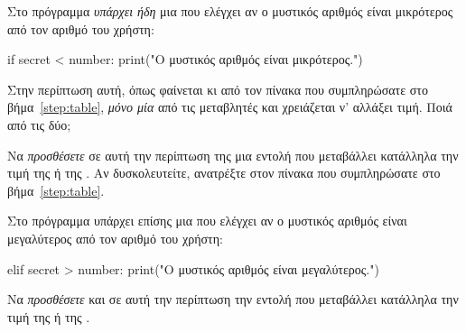 \documentclass[a4paper,11pt,oneside]{book}
\begin{document}
\begin{step}

Στο πρόγραμμα \emph{υπάρχει ήδη} μια  που ελέγχει αν ο μυστικός αριθμός είναι μικρότερος από τον αριθμό του χρήστη:

\begin{pyplain}
    if secret < number:
        print("Ο μυστικός αριθμός είναι μικρότερος.")
\end{pyplain}

Στην περίπτωση αυτή, όπως φαίνεται κι από τον πίνακα που συμπληρώσατε στο βήμα~\ref{step:table}, \emph{μόνο μία} από τις μεταβλητές  και  χρειάζεται ν' αλλάξει τιμή. Ποιά από τις δύο;

\marginnote[14pt]{\icondiscuss}
\dottedline

Να \emph{προσθέσετε} σε αυτή την περίπτωση της  μια εντολή που μεταβάλλει κατάλληλα την τιμή της  ή της . Αν δυσκολευτείτε, ανατρέξτε στον πίνακα που συμπληρώσατε στο βήμα~\ref{step:table}.

Στο πρόγραμμα υπάρχει επίσης μια  που ελέγχει αν ο μυστικός αριθμός είναι μεγαλύτερος από τον αριθμό του χρήστη:

\begin{pyplain}
    elif secret > number:
        print("Ο μυστικός αριθμός είναι μεγαλύτερος.")
\end{pyplain}

Να \emph{προσθέσετε} και σε αυτή την περίπτωση την εντολή που μεταβάλλει κατάλληλα την τιμή της  ή της . 






\end{step}
\end{document}

